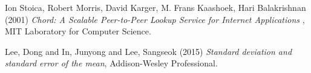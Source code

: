 \documentclass[
    a4paper,
    twocolumn,
]{article}
\begin{document}
\begin{thebibliography}{9}	
	Ion Stoica, Robert Morris, David Karger, M. Frans Kaashoek, Hari Balakrishnan (2001) \emph{Chord: A Scalable Peer-to-Peer Lookup Service for Internet Applications }, MIT Laboratory for Computer Science.
	
	Lee, Dong and In, Junyong and Lee, Sangseok (2015) \emph{Standard deviation and standard error of the mean}, Addison-Wesley Professional.
\end{thebibliography}

\printbibliography
\end{document}
